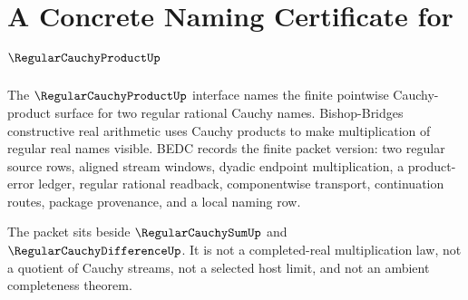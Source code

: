 \chapter{A Concrete Naming Certificate for $\RegularCauchyProductUp$}
\label{ch:concrete-instances-regularcauchyproduct-namecert}

The $\RegularCauchyProductUp$ interface names the finite pointwise Cauchy-product surface for two regular rational Cauchy names. Bishop-Bridges constructive real arithmetic uses Cauchy products to make multiplication of regular real names visible. BEDC records the finite packet version: two regular source rows, aligned stream windows, dyadic endpoint multiplication, a product-error ledger, regular rational readback, componentwise transport, continuation routes, package provenance, and a local naming row.

The packet sits beside $\RegularCauchySumUp$ and $\RegularCauchyDifferenceUp$. It is not a completed-real multiplication law, not a quotient of Cauchy streams, not a selected host limit, and not an ambient completeness theorem.

